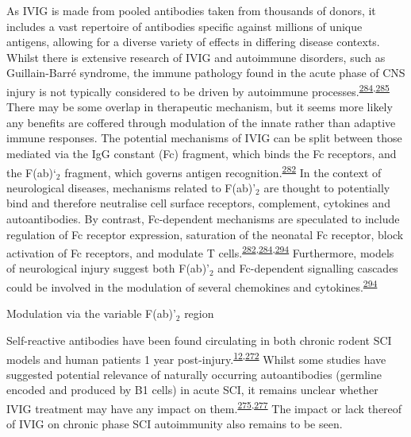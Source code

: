 \documentclass[
]{article}
\begin{document}
As IVIG is made from pooled antibodies taken from thousands of donors, it includes a vast repertoire of antibodies specific against millions of unique antigens, allowing for a diverse variety of effects in differing disease contexts.
Whilst there is extensive research of IVIG and autoimmune disorders, such as Guillain-Barré syndrome, the immune pathology found in the acute phase of CNS injury is not typically considered to be driven by autoimmune processes.\textsuperscript{\protect\hyperlink{ref-lunemann_intravenous_2015}{284},\protect\hyperlink{ref-stangel_intravenous_1998}{285}}
There may be some overlap in therapeutic mechanism, but it seems more likely any benefits are coffered through modulation of the innate rather than adaptive immune responses.
The potential mechanisms of IVIG can be split between those mediated via the IgG constant (Fc) fragment, which binds the Fc receptors, and the F(ab)`\(_2\) fragment, which governs antigen recognition.\textsuperscript{\protect\hyperlink{ref-schwab_intravenous_2013}{282}}
In the context of neurological diseases, mechanisms related to F(ab)'\(_2\) are thought to potentially bind and therefore neutralise cell surface receptors, complement, cytokines and autoantibodies.
By contrast, Fc-dependent mechanisms are speculated to include regulation of Fc receptor expression, saturation of the neonatal Fc receptor, block activation of Fc receptors, and modulate T cells.\textsuperscript{\protect\hyperlink{ref-schwab_intravenous_2013}{282},\protect\hyperlink{ref-lunemann_intravenous_2015}{284},\protect\hyperlink{ref-dalakas_mechanistic_2014}{294}}
Furthermore, models of neurological injury suggest both F(ab)'\(_2\) and Fc-dependent signalling cascades could be involved in the modulation of several chemokines and cytokines.\textsuperscript{\protect\hyperlink{ref-dalakas_mechanistic_2014}{294}}

Modulation via the variable F(ab)'\(_2\) region

Self-reactive antibodies have been found circulating in both chronic rodent SCI models and human patients 1 year post-injury.\textsuperscript{\protect\hyperlink{ref-hayes_elevated_2002}{12},\protect\hyperlink{ref-ankeny_b_2009}{272}}
Whilst some studies have suggested potential relevance of naturally occurring autoantibodies (germline encoded and produced by B1 cells) in acute SCI, it remains unclear whether IVIG treatment may have any impact on them.\textsuperscript{\protect\hyperlink{ref-palmers_antibody_2016}{275},\protect\hyperlink{ref-narang_natural_2017}{277}}
The impact or lack thereof of IVIG on chronic phase SCI autoimmunity also remains to be seen.
\end{document}
